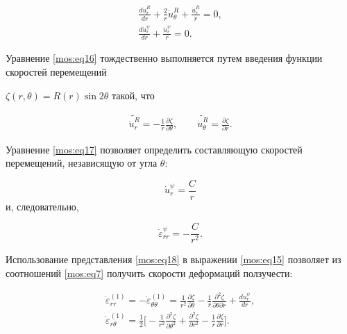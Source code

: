 \begin{gather}

\label{mos:eq16}

\frac{d \dot{u}_{r}^{R}}{d r}+\frac{2}{r}{\dot{u}_{\theta}^{R}}+\frac{{\dot{u}_{r}^{R}}}{r}=0,

\\

\label{mos:eq17}

\frac{d \dot{u}_{r}^{\psi}}{d r}+\frac{\dot{u}_{r}^{\psi}}{r}=0.

\end{gather}



Уравнение \eqref{mos:eq16} тождественно выполняется путем введения функции скоростей перемещений

$\zeta(r,\theta)=R(r)\sin{2\theta}$  такой, что

\begin{equation}

\label{mos:eq18}

\begin{array}{c}

\widetilde{\dot{u}_r^R}=\displaystyle{-\frac1r\frac{\partial\zeta}{\partial\theta}, \qquad

\widetilde{\dot{u}_{\theta}^R}=\frac{\partial\zeta}{\partial r}} .

\end{array}

\end{equation}

Уравнение \eqref{mos:eq17} позволяет определить составляющую скоростей перемещений, независящую от угла $\theta$:

$$ \dot{u}_r^{\psi}=\frac Cr$$  и, следовательно,

\begin{equation}

\label{mos:eq19}

\dot{\varepsilon}_{rr}^{\psi}=-\frac{C}{r^2}.

\end{equation}



Использование представления  \eqref{mos:eq18} в выражении  \eqref{mos:eq15} позволяет из соотношений  \eqref{mos:eq7} получить скорости деформаций ползучести:

\begin{gather}

\dot{\varepsilon}_{rr}^{(1)}=-\dot{\varepsilon}_{\theta\theta}^{(1)}=\frac{1}{r^2}\frac{\partial\zeta}{\partial\theta}-\frac1r\frac{\partial^2\zeta}{\partial\theta\partial r}+\frac{du_r^{\psi}}{dr},

\\

\dot{\varepsilon}_{r\theta}^{(1)}=\frac12\biggl[-\frac{1}{r^2}\frac{\partial^2\zeta}{\partial\theta^2}+\frac{\partial^2\zeta}{\partial r^2}-\frac{1}{r}\frac{\partial\zeta}{\partial r}\biggr].

\end{gather}

